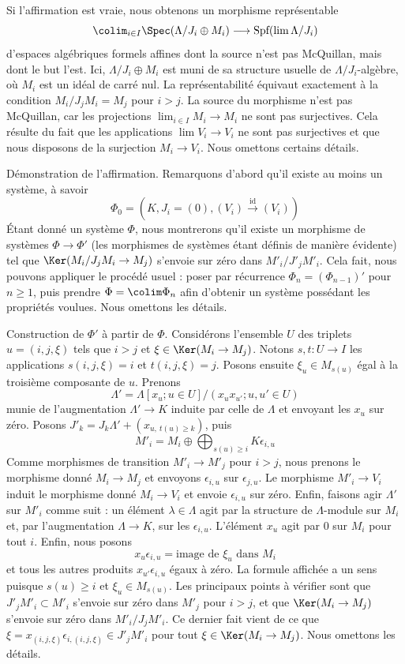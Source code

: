 \medskip\noindent
Si l'affirmation est vraie, nous obtenons un morphisme représentable
$$
\colim_{i \in I} \Spec(\Lambda/J_i \oplus M_i)
\longrightarrow
\text{Spf}(\lim \Lambda/J_i)
$$
d'espaces algébriques formels affines dont la source n'est pas McQuillan,
mais dont le but l'est. Ici, $\Lambda/J_i \oplus M_i$ est muni de sa
structure usuelle de $\Lambda/J_i$-algèbre, où $M_i$ est un idéal de carré nul.
La représentabilité équivaut exactement à la condition
$M_i/J_jM_i = M_j$ pour $i > j$. La source du morphisme n'est pas
McQuillan, car les projections
$\lim_{i \in I} M_i \to M_i$ ne sont pas surjectives. Cela résulte du fait
que les applications $\lim V_i \to V_i$ ne sont pas surjectives
et que nous disposons de la surjection $M_i \to V_i$. Nous omettons certains détails.

\medskip\noindent
Démonstration de l'affirmation. Remarquons d'abord qu'il existe au moins
un système, à savoir
$$
\Phi_0 = (K, J_i = (0), (V_i) \xrightarrow{\text{id}} (V_i))
$$
Étant donné un système $\Phi$, nous montrerons qu'il existe un morphisme
de systèmes $\Phi \to \Phi'$ (les morphismes de systèmes étant définis
de manière évidente) tel que $\Ker(M_i/J_j M_i \to M_j)$ s'envoie sur
zéro dans $M'_i/J'_j M'_i$. Cela fait, nous pouvons appliquer le procédé
usuel : poser par récurrence $\Phi_n = (\Phi_{n - 1})'$ pour $n \geq 1$,
puis prendre $\Phi = \colim \Phi_n$ afin d'obtenir un système possédant
les propriétés voulues. Nous omettons les détails.

\medskip\noindent
Construction de $\Phi'$ à partir de $\Phi$. Considérons l'ensemble $U$ des triplets $u = (i, j, \xi)$ tels que $i > j$ et
$\xi \in \Ker(M_i \to M_j)$. Notons $s, t : U \to I$ les applications
$s(i, j, \xi) = i$ et $t(i, j, \xi) = j$. Posons ensuite
$\xi_u \in M_{s(u)}$ égal à la troisième composante de $u$.
Prenons
$$
\Lambda' = \Lambda[x_u; u \in U]/(x_u x_{u'}; u, u' \in U)
$$
munie de l'augmentation $\Lambda' \to K$ induite par celle de $\Lambda$
et envoyant les $x_u$ sur zéro.
Posons $J'_k = J_k \Lambda' + (x_{u,\ t(u) \geq k})$, puis
$$
M'_i = M_i \oplus \bigoplus\nolimits_{s(u) \geq i} K\epsilon_{i, u}
$$
Comme morphismes de transition $M'_i \to M'_j$ pour $i > j$, nous prenons
le morphisme donné $M_i \to M_j$ et envoyons $\epsilon_{i, u}$ sur
$\epsilon_{j, u}$. Le morphisme $M'_i \to V_i$ induit le morphisme donné
$M_i \to V_i$ et envoie $\epsilon_{i, u}$ sur zéro.
Enfin, faisons agir $\Lambda'$ sur $M'_i$ comme suit :
un élément $\lambda \in \Lambda$ agit par la structure de $\Lambda$-module
sur $M_i$ et, par l'augmentation $\Lambda \to K$, sur les $\epsilon_{i, u}$.
L'élément $x_u$ agit par $0$ sur $M_i$ pour tout $i$.
Enfin, nous posons
$$
x_u \epsilon_{i, u} = \text{image de }\xi_u\text{ dans }M_i
$$
et tous les autres produits $x_{u'} \epsilon_{i, u}$ égaux à zéro.
La formule affichée a un sens puisque $s(u) \geq i$ et
$\xi_u \in M_{s(u)}$. Les principaux points à vérifier sont que
$J'_j M'_i \subset M'_i$ s'envoie sur zéro dans $M'_j$ pour $i > j$,
et que $\Ker(M_i \to M_j)$ s'envoie sur zéro dans
$M'_i/J_j M'_i$. Ce dernier fait vient de ce que
$\xi = x_{(i, j, \xi)} \epsilon_{i, (i, j, \xi)} \in J'_j M'_i$
pour tout $\xi \in \Ker(M_i \to M_j)$.
Nous omettons les détails.

